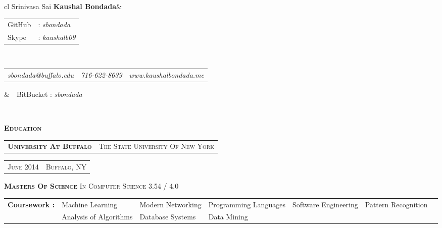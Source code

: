 \documentclass[10pt,a4paper,oneside]{article}
\begin{document}
    \begin{center}
        \begin{tabular}{cl}
            {\Huge \textmd{Srinivasa Sai} \textbf{Kaushal Bondada}}&\begin{tabular}{ll}
                                                                        \textcolor{light-gray}{GitHub}&: \textit{sbondada}\\[0.1cm]
                                                                        \textcolor{light-gray}{Skype}&: \textit{kaushalb09}
                                                                    \end{tabular}\\[0.35cm]
            \begin{tabular}{c|c|c}
                \textit{sbondada@buffalo.edu}&\textit{716-622-8639}&\textit{www.kaushalbondada.me} 
            \end{tabular}                                          &\ \ \textcolor{light-gray}{BitBucket} : \textit{sbondada}
        \end{tabular}\\[0.7cm]
        \vspace{-10pt}
        \textcolor{light-gray}{\hrulefill} 
    \end{center} 
    \textcolor{light-gray}{\textbf{\large E\textsc{ducation}}}
    \vspace{3pt}\\
    \begin{tabular}{c|c}
        \textbf{\normalsize U\textsc{niversity} A\textsc{t} B\textsc{uffalo}}
        &{\small T\textsc{he} S\textsc{tate} U\textsc{niversity} O\textsc{f} N\textsc{ew} Y\textsc{ork}}
    \end{tabular}
    \hspace{2.58in}
    \begin{tabular}{c|c}
        \textcolor{light-gray}{{\small J\textsc{une} 2014}}
        &\textcolor{light-gray}{{\small B\textsc{uffalo}, NY}}\\
    \end{tabular}
    \begin{adjustwidth}{6pt}{0pt}
        {\small \textbf{M\textsc{asters} O\textsc{f} S\textsc{cience}} I\textsc{n} C\textsc{omputer} S\textsc{cience} }
        \hspace{4.7in}
        \textcolor{light-gray}{{\small 3.54 / 4.0}}
    \end{adjustwidth}
    \vspace{1pt}
    \begin{tabular}{lllllll}
        \textbf{\footnotesize Coursework :}
        &{ \footnotesize Machine Learning }                 
        &{ \footnotesize Modern Networking }
        &{ \footnotesize Programming Languages } 
        &{ \footnotesize Software Engineering } 
        &{ \footnotesize Pattern Recognition }\\ 
        &
        { \footnotesize Analysis of Algorithms }
        &{ \footnotesize Database Systems }
        &{ \footnotesize Data Mining }
    \end{tabular}\\[0.1cm]
\end{document}
